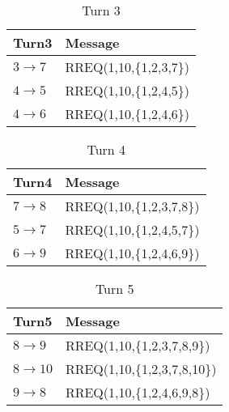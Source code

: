 \documentclass[a4paper, 11 pt, article, accentcolor=tud7b]{tudreport}
\begin{document}
	\begin{table}[h]
	  \centering
	  \begin{tabular}{| l | l |}
	    \hline
	    Turn3  & Message \\ \hline
	    $3 \rightarrow 7$ & RREQ(1,10,\{1,2,3,7\}) \\ \hline 
	    $4 \rightarrow 5$ & RREQ(1,10,\{1,2,4,5\}) \\ \hline 
	    $4 \rightarrow 6$ & RREQ(1,10,\{1,2,4,6\}) \\ \hline 
	  \end{tabular}
	  \caption{Turn 3}
	\end{table}
	
	\begin{table}[h]
	  \centering
	  \begin{tabular}{| l | l |}
	    \hline
	    Turn4  & Message \\ \hline
	    $7 \rightarrow 8$ & RREQ(1,10,\{1,2,3,7,8\}) \\ \hline 
	    $5 \rightarrow 7$ & RREQ(1,10,\{1,2,4,5,7\}) \\ \hline 
	    $6 \rightarrow 9$ & RREQ(1,10,\{1,2,4,6,9\}) \\ \hline 
	  \end{tabular}
	  \caption{Turn 4}
	\end{table}
	
	\begin{table}[h]
	  \centering
	  \begin{tabular}{| l | l |}
	    \hline
	    Turn5  & Message \\ \hline
	    $8 \rightarrow 9$ & RREQ(1,10,\{1,2,3,7,8,9\}) \\ \hline
	    $8 \rightarrow 10$ & RREQ(1,10,\{1,2,3,7,8,10\}) \\ \hline 
	    $9 \rightarrow 8$ & RREQ(1,10,\{1,2,4,6,9,8\}) \\ \hline 
	  \end{tabular}
	  \caption{Turn 5}
	\end{table}
	
\end{document}
